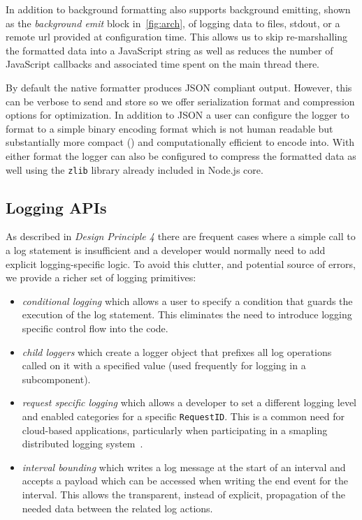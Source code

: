 In addition to background formatting \projn also supports background emitting, 
shown as the \emph{background emit} block in~\autoref{fig:arch}, of 
logging data to files, stdout, or a remote url provided at configuration time. This 
allows us to skip re-marshalling the formatted data into a JavaScript string as well 
as reduces the number of JavaScript callbacks and associated time spent on the 
main thread there. 

By default the native formatter produces JSON compliant output. However, this 
can be verbose to send and store so we offer serialization format and compression 
options for optimization. In addition to JSON a user can configure the logger 
to format to a simple binary encoding format which is not human readable but 
substantially more compact () and computationally efficient to 
encode into. With either format the logger can also be configured to compress the 
formatted data as well using the \texttt{zlib} library already included in 
Node.js core.

\subsection{Logging APIs}
As described in \emph{Design Principle 4} there are frequent cases where a 
simple call to a log statement is insufficient and a developer would normally 
need to add explicit logging-specific logic. To avoid this clutter, and potential 
source of errors, we provide a richer set of logging primitives:
\begin{itemize}
  \item \emph{conditional logging} which allows a user to specify a condition 
  that guards the execution of the log statement. This eliminates the need to 
  introduce logging specific control flow into the code.
  \item \emph{child loggers} which create a logger object that prefixes all log 
  operations called on it with a specified value (used frequently for logging in a 
  subcomponent).
  \item \emph{request specific logging} which allows a developer to set a different 
  logging level and enabled categories for a specific \texttt{RequestID}. This is a 
  common need for cloud-based applications, particularly when participating in a 
  smapling distributed logging system~\cite{distlogger}.
  \item \emph{interval bounding} which writes a log message at the start of an interval 
  and accepts a payload which can be accessed when writing the end event for the interval. 
  This allows the transparent, instead of explicit, propagation of the needed data between 
  the related log actions.
\end{itemize}

